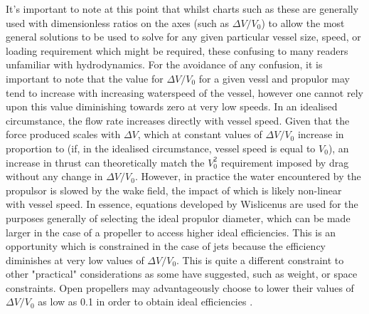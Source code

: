 \documentclass{article}\usepackage[]{graphicx}\usepackage[]{color}
\begin{document}
It's important to note at this point that whilst charts such as these are generally used with dimensionless ratios on the axes (such as $\Delta V / V_0$) to allow the most general solutions to be used to solve for any given particular vessel size, speed, or loading requirement which might be required, these  confusing to many readers unfamiliar with hydrodynamics.  For the avoidance of any confusion, it is important to note that the value for $\Delta V / V_0$ for a given vessl and propulor may tend to increase with increasing waterspeed of the vessel, however one cannot rely upon this value diminishing towards zero at very low speeds.  In an idealised circumstance, the flow rate increases directly with vessel speed.  Given that the force produced scales with $\Delta V$, which at constant values of $\Delta V / V_0$ increase in proportion to (if, in the idealised circumstance, vessel speed is equal to $V_0$), an increase in thrust can theoretically match the $V_0^2$ requirement imposed by drag without any change in $\Delta V / V_0$.  However, in practice the water encountered by the propulsor is slowed by the wake field, the impact of which is likely non-linear with vessel speed.  In essence, equations developed by Wislicenus are used for the purposes generally of selecting the ideal propulor diameter, which can be made larger in the case of a propeller to access higher ideal efficiencies.  This is an opportunity which is constrained in the case of jets because the efficiency diminishes at very low values of $\Delta V / V_0$.  This is quite a different constraint to other "practical" considerations as some have suggested, such as weight, or space constraints.  Open propellers may advantageously choose to lower their values of $\Delta V / V_0$ as low as 0.1 in order to obtain ideal efficiencies \parencite{wislicenus1973}.
\end{document}
